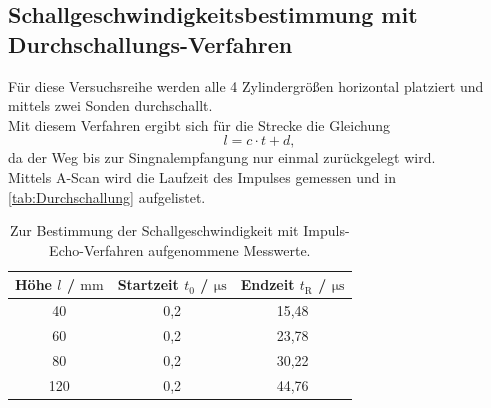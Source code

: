 \subsection{Schallgeschwindigkeitsbestimmung mit Durchschallungs-Verfahren}

  Für diese Versuchsreihe werden alle 4 Zylindergrößen horizontal platziert und mittels zwei Sonden durchschallt.\\
  Mit diesem Verfahren ergibt sich für die Strecke die Gleichung 
  \begin{equation*}
    l = c \cdot t + d,
  \end{equation*}
  da der Weg bis zur Singnalempfangung nur einmal zurückgelegt wird.\\
  Mittels A-Scan wird die Laufzeit des Impulses gemessen und in \autoref{tab:Durchschallung} aufgelistet.
  \begin{table}
    \centering
    \caption{Zur Bestimmung der Schallgeschwindigkeit mit Impuls-Echo-Verfahren aufgenommene Messwerte.}
    \label{tab:Durchschallung}
    \begin{tabular}{c | c c}
      Höhe $l$ / $\si{\milli\meter}$ & Startzeit $t_0$ / $\si{\micro\second}$ & Endzeit $t_{\mathrm{R}}$ / $\si{\micro\second}$ \\
        \midrule
        40   & 0,2 & 15,48\\
        60   & 0,2 & 23,78\\
        80   & 0,2 & 30,22\\
        120  & 0,2 & 44,76\\
        \bottomrule
      \end{tabular}
  \end{table}

